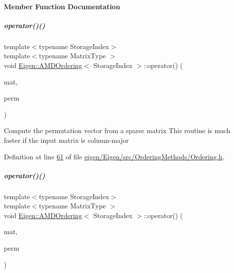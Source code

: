 \paragraph{Member Function Documentation}
\mbox{\label{group___ordering_methods___module_afce433557abcba9e49fa81581a58fa51}} 
\subparagraph{\texorpdfstring{operator()()}{operator()()}\hspace{0.1cm}{\footnotesize\ttfamily [1/4]}}
{\footnotesize\ttfamily template$<$typename Storage\+Index$>$ \\
template$<$typename Matrix\+Type $>$ \\
void \hyperlink{group___ordering_methods___module_class_eigen_1_1_a_m_d_ordering}{Eigen\+::\+A\+M\+D\+Ordering}$<$ Storage\+Index $>$\+::operator() (\begin{DoxyParamCaption}\item[{const Matrix\+Type \&}]{mat,  }\item[{\hyperlink{group___core___module}{Permutation\+Type} \&}]{perm }\end{DoxyParamCaption})\hspace{0.3cm}{\ttfamily [inline]}}

Compute the permutation vector from a sparse matrix This routine is much faster if the input matrix is column-\/major 

Definition at line \hyperlink{eigen_2_eigen_2src_2_ordering_methods_2_ordering_8h_source_l00061}{61} of file \hyperlink{eigen_2_eigen_2src_2_ordering_methods_2_ordering_8h_source}{eigen/\+Eigen/src/\+Ordering\+Methods/\+Ordering.\+h}.

\mbox{\label{group___ordering_methods___module_afce433557abcba9e49fa81581a58fa51}} 
\subparagraph{\texorpdfstring{operator()()}{operator()()}\hspace{0.1cm}{\footnotesize\ttfamily [2/4]}}
{\footnotesize\ttfamily template$<$typename Storage\+Index$>$ \\
template$<$typename Matrix\+Type $>$ \\
void \hyperlink{group___ordering_methods___module_class_eigen_1_1_a_m_d_ordering}{Eigen\+::\+A\+M\+D\+Ordering}$<$ Storage\+Index $>$\+::operator() (\begin{DoxyParamCaption}\item[{const Matrix\+Type \&}]{mat,  }\item[{\hyperlink{group___core___module}{Permutation\+Type} \&}]{perm }\end{DoxyParamCaption})\hspace{0.3cm}{\ttfamily [inline]}}

